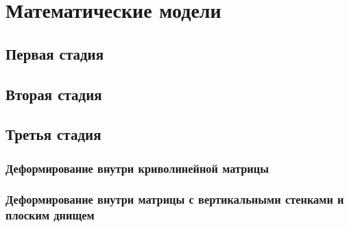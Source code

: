 \chapter{Математические модели}
\section{Первая стадия}
\section{Вторая стадия}
\section{Третья стадия}
	\subsection{Деформирование внутри криволинейной матрицы}
	\subsection{Деформирование внутри матрицы с вертикальными стенками и плоским днищем}
